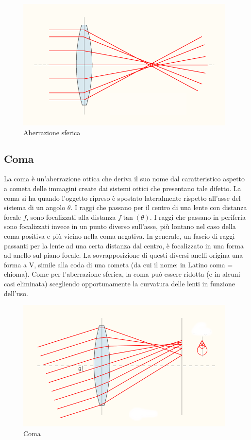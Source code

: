 \begin{figure}

\centering
\includegraphics[width=.5\textwidth]{img/aberrazione-sferica.png}

\caption{Aberrazione sferica}
\label{fig:astigmatismo}
\end{figure}

\subsection{Coma}  
La coma è un'aberrazione ottica che deriva il suo nome dal caratteristico
aspetto a cometa delle immagini create dai sistemi ottici che presentano tale
difetto. La coma si ha quando l'oggetto ripreso è spostato lateralmente
rispetto all'asse del sistema di un angolo $\theta$. I raggi che passano per il
centro di una lente con distanza focale $f$, sono focalizzati alla distanza $f \tan(\theta)$.
I raggi che passano in periferia sono focalizzati invece in un punto
diverso sull'asse, più lontano nel caso della coma positiva e più vicino nella
coma negativa. In generale, un fascio di raggi passanti per la lente ad una
certa distanza dal centro, è focalizzato in una forma ad anello sul piano
focale. La sovrapposizione di questi diversi anelli origina una forma a V,
simile alla coda di una cometa (da cui il nome: in Latino coma = chioma). Come
per l'aberrazione sferica, la coma può essere ridotta (e in alcuni casi
eliminata) scegliendo opportunamente la curvatura delle lenti in funzione
dell'uso.

\begin{figure}

\centering
\includegraphics[width=.5\textwidth]{img/coma.png}

\caption{Coma}
\label{fig:coma}
\end{figure}

